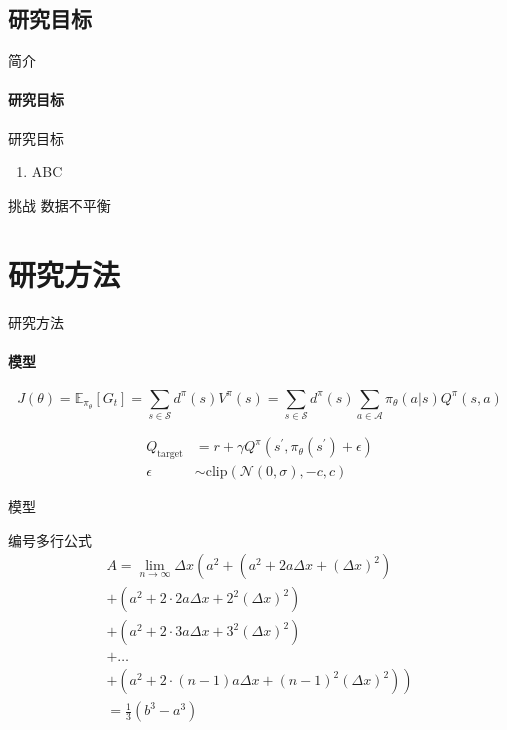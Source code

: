 \documentclass[
10pt,
aspectratio=169,
]{beamer}
\begin{document}
\subsection{研究目标}
\begin{frame}[c]{简介}
	\framesubtitle{研究目标}
	\begin{block}{研究目标}
		\begin{enumerate}
			\item ABC
		\end{enumerate}
	\end{block}
	
	\begin{alertblock}{挑战}
		数据不平衡
	\end{alertblock}
	
\end{frame}	

\section{研究方法}



\begin{frame}{研究方法}
	\framesubtitle{模型}
	\begin{equation*}
		J(\theta) = \mathbb{E}_{\pi_\theta}[G_t] = \sum_{s\in\mathcal{S}} d^\pi (s)V^\pi(s)=\sum_{s\in\mathcal{S}} d^\pi(s)\sum_{a\in\mathcal{A}}\pi_\theta(a|s)Q^\pi(s,a)
	\end{equation*}
	
	\begin{align}
		Q_\mathrm{target}&=r+\gamma Q^\pi(s^\prime, \pi_\theta(s^\prime)+\epsilon)\\
		\epsilon&\sim\mathrm{clip}(\mathcal{N}(0, \sigma), -c, c)\nonumber
	\end{align}
\end{frame}

\begin{frame}{模型}
	\begin{alertblock}{编号多行公式}
		\begin{multline}
			A=\lim_{n\rightarrow\infty}\Delta x\left(a^{2}+\left(a^{2}+2a\Delta x+\left(\Delta x\right)^{2}\right)\right.\label{eq:reset}\\
			+\left(a^{2}+2\cdot2a\Delta x+2^{2}\left(\Delta x\right)^{2}\right)\\
			+\left(a^{2}+2\cdot3a\Delta x+3^{2}\left(\Delta x\right)^{2}\right)\\
			+\ldots\\
			\left.+\left(a^{2}+2\cdot(n-1)a\Delta x+(n-1)^{2}\left(\Delta x\right)^{2}\right)\right)\\
			=\frac{1}{3}\left(b^{3}-a^{3}\right)
		\end{multline}
	\end{alertblock}
\end{frame}
\end{document}
